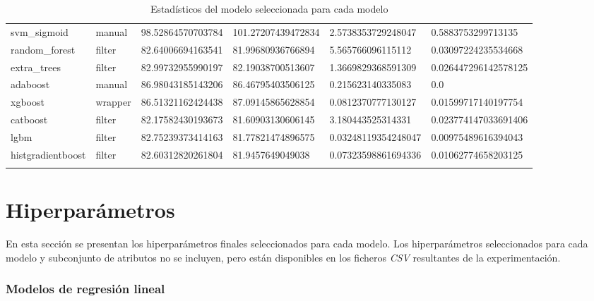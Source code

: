 {\begin{longtable}[c]{@{}llllll@{}}
	svm\_sigmoid         & manual               & 98.52864570703784 & 101.27207439472834 & 2.5738353729248047   & 0.5883753299713135   \\
	\rowcolor[HTML]{EFEFEF} 
	random\_forest       & filter               & 82.64006694163541 & 81.99680936766894  & 5.565766096115112    & 0.03097224235534668  \\
	extra\_trees         & filter               & 82.99732955990197 & 82.19038700513607  & 1.3669829368591309   & 0.026447296142578125 \\
	\rowcolor[HTML]{EFEFEF} 
	adaboost             & manual               & 86.98043185143206 & 86.46795403506125  & 0.215623140335083    & 0.0                  \\
	xgboost              & wrapper              & 86.51321162424438 & 87.09145865628854  & 0.0812370777130127   & 0.01599717140197754  \\
	\rowcolor[HTML]{EFEFEF} 
	catboost             & filter               & 82.17582430193673 & 81.60903130606145  & 3.180443525314331    & 0.023774147033691406 \\
	lgbm                 & filter               & 82.75239373414163 & 81.77821474896575  & 0.03248119354248047  & 0.00975489616394043  \\
	\rowcolor[HTML]{EFEFEF} 
	histgradientboost    & filter               & 82.60312820261804 & 81.9457649049038   & 0.07323598861694336  & 0.01062774658203125  \\* \bottomrule
	\caption{Estadísticos del modelo seleccionada para cada modelo}
	\label{tab:annexvalidation}\\
\end{longtable}}

\section{Hiperparámetros}

En esta sección se presentan los hiperparámetros finales seleccionados para cada modelo. Los hiperparámetros seleccionados para cada modelo y subconjunto de atributos no se incluyen, pero están disponibles en los ficheros \textit{CSV} resultantes de la experimentación.

\subsubsection{Modelos de regresión lineal}


